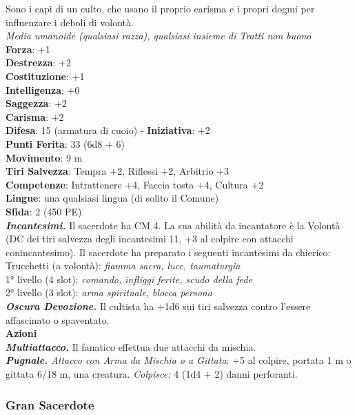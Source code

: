 \begin{multicols}{2}
Sono i capi di un culto, che usano il proprio carisma e i propri dogmi per influenzare i deboli di volontà.\\
\emph{Media umanoide (qualsiasi razza), qualsiasi insieme di Tratti non buono}\\
\textbf{Forza}: +1\\
\textbf{Destrezza}: +2\\
\textbf{Costituzione}: +1\\
\textbf{Intelligenza}: +0\\
\textbf{Saggezza}: +2\\
\textbf{Carisma}: +2\\
\textbf{Difesa}: 15 (armatura di cuoio) - \textbf{Iniziativa}: +2\\
\textbf{Punti Ferita}: 33 (6d8 + 6)\\
\textbf{Movimento}: 9 m\\
\textbf{Tiri Salvezza}: Tempra +2, Riflessi +2, Arbitrio +3 \\
\textbf{Competenze}: Intrattenere +4, Faccia tosta +4, Cultura +2\\
\textbf{Lingue}: una qualsiasi lingua (di solito il Comune)\\
\textbf{Sfida}: 2 (450 PE)\smallskip\\
\emph{\textbf{Incantesimi.}} Il sacerdote ha CM 4. La sua abilità da incantatore è la Volontà (DC dei tiri salvezza degli incantesimi 11, +3 al colpire con attacchi conincantesimo). Il sacerdote ha preparato i seguenti incantesimi da chierico:\\
Trucchetti (a volontà): \emph{fiamma sacra, luce, taumaturgia} \\
1° livello (4 slot): \emph{comando, infliggi ferite, scudo della fede}\\
2° livello (3 slot): \emph{arma spirituale, blocca persona}\\
\emph{\textbf{Oscura Devozione.}} Il cultista ha +1d6 sui tiri salvezza contro l'essere affascinato o spaventato.\\
\smallskip\textbf{Azioni}\\
\emph{\textbf{Multiattacco.}} Il fanatico effettua due attacchi da mischia.\\
\emph{\textbf{Pugnale.} Attacco con Arma da Mischia o a Gittata}: +5 al colpire, portata 1 m o gittata 6/18 m, una creatura. \emph{Colpisce:} 4 (1d4 + 2) danni perforanti. \\

\subsubsection{Gran Sacerdote}


\end{multicols}
